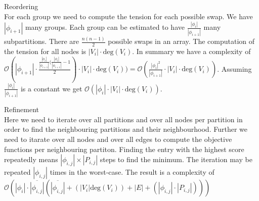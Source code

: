     Reordering \\
    For each group we need to compute the tension for each possible swap. 
        We have $|\phi_{i + 1}|$ many groups.
        Each group can be estimated to have $\frac{|\phi_{i}|}{|\phi_{i + 1}|}$ many subpartitions.
        There are $\frac{n(n-1)}{2}$ possible swaps in an array. 
        The computation of the tension for all nodes is $|V_i| \cdot \text{deg}(V_i)$.
        In summary we have a complexity of $\mathcal{O}(|\phi_{i + 1}| \cdot \frac{\frac{|\phi_{i}|}{|\phi_{i + 1}|}(\frac{|\phi_{i}|}{|\phi_{i + 1}|} - 1}{2}) \cdot |V_i| \cdot \text{deg}(V_i)) = \mathcal{O}(\frac{|\phi_{i}|^2}{|\phi_{i + 1}|} \cdot |V_i| \cdot \text{deg}(V_i))$. 
        Assuming $\frac{|\phi_{i}|}{|\phi_{i + 1}|}$ is a constant we get $\mathcal{O}(|\phi_{i}| \cdot |V_i| \cdot \text{deg}(V_i))$.
        
    Refinement \\
    Here we need to iterate over all partitions and over all nodes per partition in order to find the neighbouring partitions and their neighbourhood. 
        Further we need to itarate over all nodes and over all edges to compute the objective functions per neighbouring partiton.
        Finding the entry with the highest score repeatedly means $|\phi_{i,j}| \times |P_{i,j}|$ steps to find the minimum.
        The iteration may be repeated $|\phi_{i,j}|$ times in the worst-case.
        The result is a complexity of $\mathcal{O}(|\phi_{i}| \cdot \overline{|\phi_{i,j}|} (\overline{|\phi_{i,j}|} + (|V_i| \text{deg}(V_i)) + |E| + (|\phi_{i,j}| \cdot |P_{i,j}|)))$
